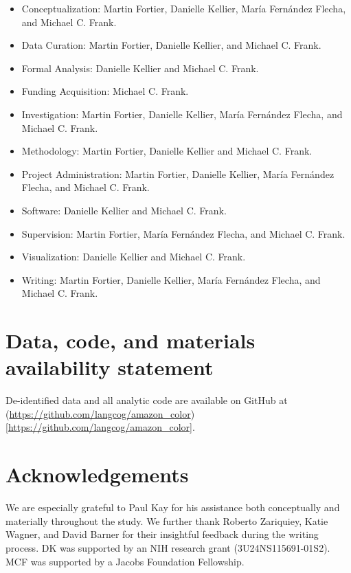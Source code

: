 \documentclass[
  english,
  ,apa7,floatsintext]{apa6}
\begin{document}
\begin{itemize}
\item
  Conceptualization: Martin Fortier, Danielle Kellier, María Fernández Flecha, and Michael C. Frank.
\item
  Data Curation: Martin Fortier, Danielle Kellier, and Michael C. Frank.
\item
  Formal Analysis: Danielle Kellier and Michael C. Frank.
\item
  Funding Acquisition: Michael C. Frank.
\item
  Investigation: Martin Fortier, Danielle Kellier, María Fernández Flecha, and Michael C. Frank.
\item
  Methodology: Martin Fortier, Danielle Kellier and Michael C. Frank.
\item
  Project Administration: Martin Fortier, Danielle Kellier, María Fernández Flecha, and Michael C. Frank.
\item
  Software: Danielle Kellier and Michael C. Frank.
\item
  Supervision: Martin Fortier, María Fernández Flecha, and Michael C. Frank.
\item
  Visualization: Danielle Kellier and Michael C. Frank.
\item
  Writing: Martin Fortier, Danielle Kellier, María Fernández Flecha, and Michael C. Frank.
\end{itemize}

\hypertarget{data-code-and-materials-availability-statement}{%
\section{Data, code, and materials availability statement}\label{data-code-and-materials-availability-statement}}

De-identified data and all analytic code are available on GitHub at (\url{https://github.com/langcog/amazon_color}){[}\url{https://github.com/langcog/amazon_color}{]}.

\hypertarget{acknowledgements}{%
\section{Acknowledgements}\label{acknowledgements}}

We are especially grateful to Paul Kay for his assistance both conceptually and materially throughout the study. We further thank Roberto Zariquiey, Katie Wagner, and David Barner for their insightful feedback during the writing process. DK was supported by an NIH research grant (3U24NS115691-01S2). MCF was supported by a Jacobs Foundation Fellowship.
\end{document}
